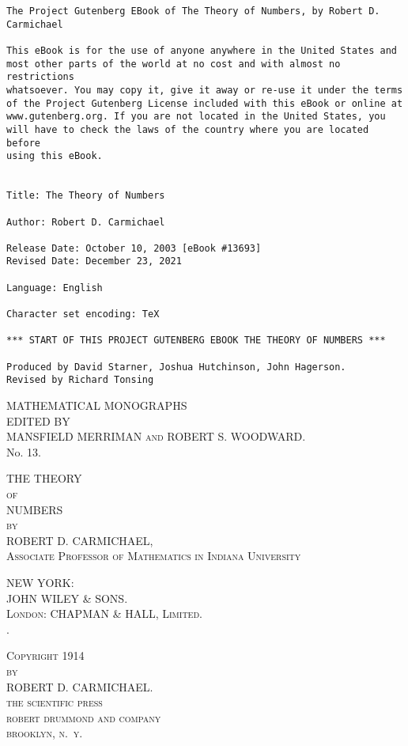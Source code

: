 \documentclass[oneside]{book}
\begin{document}
\thispagestyle{empty}
\small
\begin{verbatim}
The Project Gutenberg EBook of The Theory of Numbers, by Robert D. Carmichael

This eBook is for the use of anyone anywhere in the United States and   
most other parts of the world at no cost and with almost no restrictions
whatsoever. You may copy it, give it away or re-use it under the terms  
of the Project Gutenberg License included with this eBook or online at  
www.gutenberg.org. If you are not located in the United States, you     
will have to check the laws of the country where you are located before 
using this eBook.                                                       


Title: The Theory of Numbers

Author: Robert D. Carmichael

Release Date: October 10, 2003 [eBook #13693]
Revised Date: December 23, 2021

Language: English

Character set encoding: TeX

*** START OF THIS PROJECT GUTENBERG EBOOK THE THEORY OF NUMBERS ***

Produced by David Starner, Joshua Hutchinson, John Hagerson.
Revised by Richard Tonsing
\end{verbatim}
\normalsize
\newpage

\frontmatter

\begin{center}
\noindent \Large MATHEMATICAL MONOGRAPHS \\

\bigskip \footnotesize{EDITED BY} \\
\normalsize \textsc{MANSFIELD MERRIMAN and ROBERT S. WOODWARD.} \\

\bigskip\bigskip \huge
No. 13.

\bigskip\bigskip \huge THE THEORY \\
\bigskip\small \textsc{of}  \\
\bigskip\huge NUMBERS \\

\bigskip\bigskip\footnotesize\textsc{by} \\
\bigskip\large ROBERT D. CARMICHAEL, \\
\footnotesize\textsc{Associate Professor of Mathematics in Indiana
University}

\bigskip\bigskip\normalsize NEW YORK: \\
\medskip JOHN WILEY \& SONS. \\
\medskip \textsc{London: CHAPMAN \& HALL, Limited.} \\
.

\bigskip\bigskip
\tiny \textsc{Copyright 1914} \\
\textsc{by} \\
ROBERT D. CARMICHAEL. \\
\medskip \textsc{the scientific press} \\
\textsc{robert drummond and company} \\
\textsc{brooklyn, n.~y.}
\end{center}
\end{document}
